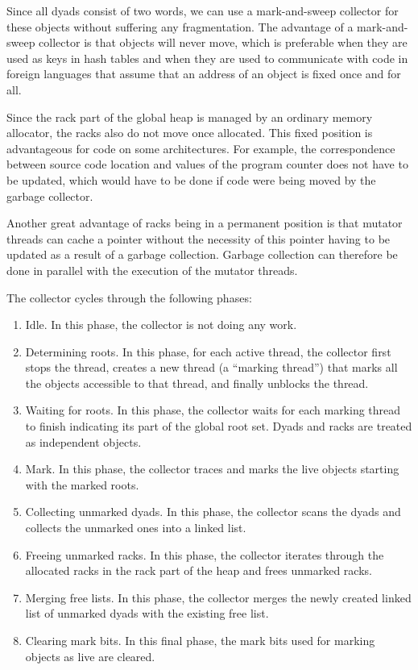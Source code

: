 Since all dyads consist of two words, we can use a mark-and-sweep
collector for these objects without suffering any fragmentation.  The
advantage of a mark-and-sweep collector is that objects will never
move, which is preferable when they are used as keys in hash tables
and when they are used to communicate with code in foreign languages
that assume that an address of an object is fixed once and for all.

Since the rack part of the global heap is managed by an ordinary
memory allocator, the racks also do not move once allocated.  This
fixed position is advantageous for code on some architectures.  For
example, the correspondence between source code location and values of
the program counter does not have to be updated, which would have to
be done if code were being moved by the garbage collector.

Another great advantage of racks being in a permanent position is that
mutator threads can cache a pointer without the necessity of this
pointer having to be updated as a result of a garbage collection.
Garbage collection can therefore be done in parallel with the
execution of the mutator threads.

The collector cycles through the following phases:

\begin{enumerate}
\item Idle.  In this phase, the collector is not doing any work.
\item Determining roots.  In this phase, for each active thread, the
  collector first stops the thread, creates a new thread (a ``marking
  thread'') that marks all the objects accessible to that thread, and
  finally unblocks the thread.
\item Waiting for roots.  In this phase, the collector waits for each
  marking thread to finish indicating its part of the global root set.
  Dyads and racks are treated as independent objects.
\item Mark.  In this phase, the collector traces and marks the
  live objects starting with the marked roots.
\item Collecting unmarked dyads.  In this phase, the collector
  scans the dyads and collects the unmarked ones into a linked list.
\item Freeing unmarked racks.  In this phase, the collector
  iterates through the allocated racks in the rack part of the heap
  and frees unmarked racks.
\item Merging free lists.  In this phase, the collector merges
  the newly created linked list of unmarked dyads with the existing
  free list.
\item Clearing mark bits.  In this final phase, the mark bits used for
  marking objects as live are cleared.
\end{enumerate}

